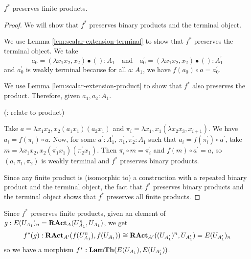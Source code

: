 \begin{lemma}
  $ f^* $ preserves finite products.
\end{lemma}
\begin{proof}
  We will show that $ f^* $ preserves binary products and the terminal object.

  We use Lemma \ref{lem:scalar-extension-terminal} to show that $ f^* $ preserves the terminal object. We take
  \[ a_0 = (\lambda x_1 x_2, x_2) \bullet () : A_1 \quad \text{and} \quad a_0^\prime = (\lambda x_1 x_2, x_2) \bullet () : A^\prime_1 \]
  and $ a_0^\prime $ is weakly terminal because for all $ a : A_1 $, we have $ f(a_0) \circ a = a_0^\prime $.

  We use Lemma \ref{lem:scalar-extension-product} to show that $ f^* $ also preserves the product. Therefore, given $ a_1, a_2 : A_1 $.

  (\TODO: relate to product)

  Take $ a = \lambda x_1 x_2, x_2 (a_1 x_1) (a_2 x_1) $ and $ \pi_i = \lambda x_1, x_1 (\lambda x_2 x_3, x_{i + 1}) $. We have $ a_i = f(\pi_i) \circ a $. Now, for some $ a^\prime: A^\prime_1 $, $ \pi_1^\prime, \pi_2^\prime: A_1 $ such that $ a_i = f(\pi_i^\prime) \circ a^\prime $, take $ m = \lambda x_1 x_2, x_2 (\pi_1^\prime x_1) (\pi_2^\prime x_1) $. Then $ \pi_i \circ m = \pi_i^\prime $ and $ f(m) \circ a^\prime = a $, so $ (a, \pi_1, \pi_2) $ is weakly terminal and $ f^* $ preserves binary products.

  Since any finite product is (isomorphic to) a construction with a repeated binary product and the terminal object, the fact that $ f^* $ preserves binary products and the terminal object shows that $ f^* $ preserves all finite products.
\end{proof}

\begin{definition}
  Since $ f^* $ preserves finite products, given an element of $ g: E(U_{A_1})_n = \mathbf{RAct}_{A}(U_{A_1}^n, U_{A_1}) $, we get
  \[ f^*(g): \mathbf{RAct}_{A^\prime}(f(U_{A_1}^n), f(U_{A_1})) \cong \mathbf{RAct}_{A^\prime}((U_{A^\prime_1})^n, U_{A^\prime_1}) = E(U_{A^\prime_1})_n \]
  so we have a morphism $ f^*: \mathbf{LamTh}(E(U_{A_1}), E(U_{A^\prime_1})) $.
\end{definition}

